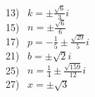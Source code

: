 \documentclass[12pt]{book}
\theoremstyle{definition}
\begin{document}
\begin{multicols}{3}
  13)~ $k=\pm\frac{\sqrt{6}}{3}i$\\
  15)~ $n=\pm\frac{\sqrt{6}}{6}$\\
  17)~ $p=-\frac{1}{5}\pm\frac{\sqrt{29}}{5}i$\\
  21)~ $b=\pm\sqrt{2}i$\\
  25)~ $n=\frac{1}{4}\pm\frac{\sqrt{159}}{12}i$\\
  27)~ $x=\pm\sqrt{3}$\\

\end{multicols}
\end{document}
